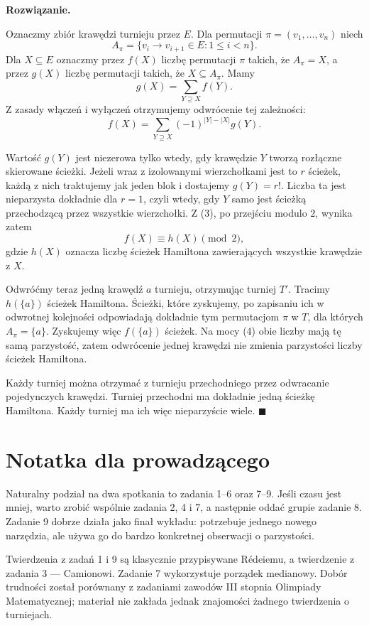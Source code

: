 \documentclass{lecture-kuznia}
\newenvironment{solutionbox}{%
    \par\smallskip\begingroup\color{black!85}%
    \noindent\textbf{Rozwiązanie. }%
  }{%
    \hfill$\blacksquare$\par\smallskip\endgroup
  }
\newcounter{zadanie}
\begin{document}
\begin{solutionbox}
Oznaczmy zbiór krawędzi turnieju przez $E$. Dla permutacji
$\pi=(v_1,\ldots,v_n)$ niech
\[
  A_\pi=\{v_i\to v_{i+1}\in E:1\leq i<n\}.
\]
Dla $X\subseteq E$ oznaczmy przez $f(X)$ liczbę permutacji $\pi$ takich, że
$A_\pi=X$, a przez $g(X)$ liczbę permutacji takich, że $X\subseteq A_\pi$.
Mamy
\[
  g(X)=\sum_{Y\supseteq X}f(Y).
\]
Z zasady włączeń i wyłączeń otrzymujemy odwrócenie tej zależności:
\[
  f(X)=\sum_{Y\supseteq X}(-1)^{|Y|-|X|}g(Y).           \tag{3}
\]

Wartość $g(Y)$ jest niezerowa tylko wtedy, gdy krawędzie $Y$ tworzą rozłączne
skierowane ścieżki. Jeżeli wraz z izolowanymi wierzchołkami jest to $r$
ścieżek, każdą z nich traktujemy jak jeden blok i dostajemy $g(Y)=r!$.
Liczba ta jest nieparzysta dokładnie dla $r=1$, czyli wtedy, gdy $Y$ samo
jest ścieżką przechodzącą przez wszystkie wierzchołki. Z (3), po przejściu
modulo $2$, wynika zatem
\[
  f(X)\equiv h(X)\pmod 2,                               \tag{4}
\]
gdzie $h(X)$ oznacza liczbę ścieżek Hamiltona zawierających wszystkie
krawędzie z $X$.

Odwróćmy teraz jedną krawędź $a$ turnieju, otrzymując turniej $T'$. Tracimy
$h(\{a\})$ ścieżek Hamiltona. Ścieżki, które zyskujemy, po zapisaniu ich
w odwrotnej kolejności odpowiadają dokładnie tym permutacjom $\pi$ w $T$,
dla których $A_\pi=\{a\}$. Zyskujemy więc $f(\{a\})$ ścieżek. Na mocy (4)
obie liczby mają tę samą parzystość, zatem odwrócenie jednej krawędzi nie
zmienia parzystości liczby ścieżek Hamiltona.

Każdy turniej można otrzymać z turnieju przechodniego przez odwracanie
pojedynczych krawędzi. Turniej przechodni ma dokładnie jedną ścieżkę
Hamiltona. Każdy turniej ma ich więc nieparzyście wiele.
\end{solutionbox}

\ifshowsolutions
\section{Notatka dla prowadzącego}

Naturalny podział na dwa spotkania to zadania 1--6 oraz 7--9. Jeśli czasu jest
mniej, warto zrobić wspólnie zadania 2, 4 i 7, a następnie oddać grupie
zadanie 8. Zadanie 9 dobrze działa jako finał wykładu: potrzebuje jednego
nowego narzędzia, ale używa go do bardzo konkretnej obserwacji o parzystości.

Twierdzenia z zadań 1 i 9 są klasycznie przypisywane Rédeiemu, a twierdzenie
z zadania 3 --- Camionowi. Zadanie 7 wykorzystuje porządek medianowy. Dobór
trudności został porównany z zadaniami zawodów III stopnia Olimpiady
Matematycznej; materiał nie zakłada jednak znajomości żadnego twierdzenia o
turniejach.
\fi
\end{document}
